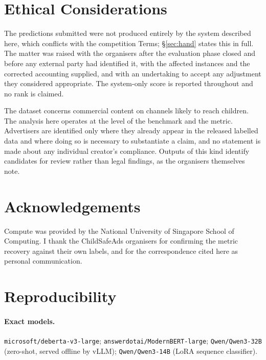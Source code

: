 \documentclass[11pt]{article}
\newcommand{\lab}[1]{\texttt{\small #1}}
\begin{document}
\section*{Ethical Considerations}

The predictions submitted were not produced entirely by the system described here, which
conflicts with the competition Terms; \S\ref{sec:hand} states this in full. The matter was raised
with the organisers after the evaluation phase closed and before any external party had
identified it, with the affected instances and the corrected accounting supplied, and with an
undertaking to accept any adjustment they considered appropriate. The system-only score is
reported throughout and no rank is claimed.

The dataset concerns commercial content on channels likely to reach children. The analysis here
operates at the level of the benchmark and the metric. Advertisers are identified only where they
already appear in the released labelled data and where doing so is necessary to substantiate a
claim, and no statement is made about any individual creator's compliance. Outputs of this kind
identify candidates for review rather than legal findings, as the organisers themselves note.

\section*{Acknowledgements}

Compute was provided by the National University of Singapore School of Computing. I thank the
ChildSafeAds organisers for confirming the metric recovery against their own labels, and for the
correspondence cited here as personal communication.



\appendix

\section{Reproducibility}
\label{app:repro}

\paragraph{Exact models.}
\lab{microsoft/deberta-v3-large}; \lab{answerdotai/ModernBERT-large}; \lab{Qwen/Qwen3-32B}
(zero-shot, served offline by vLLM); \lab{Qwen/Qwen3-14B} (LoRA sequence classifier).
\end{document}
